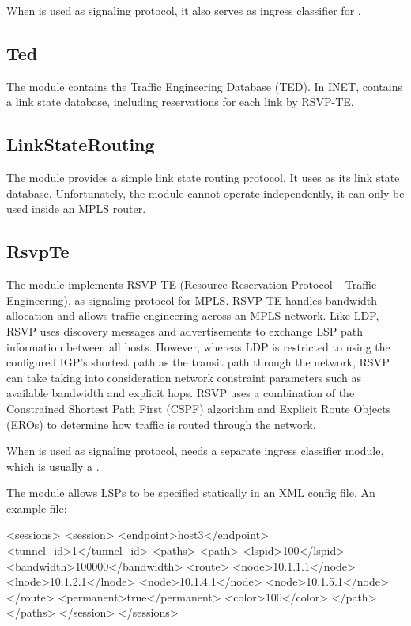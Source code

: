 When  is used as signaling protocol, it also serves as ingress
classifier for .

\subsection{Ted}
\label{sec:mpls:ted}

The  module contains the Traffic Engineering Database (TED).
In INET,  contains a link state database, including reservations
for each link by RSVP-TE.

\subsection{LinkStateRouting}
\label{sec:mpls:linkstaterouting}

The  module provides a simple link state routing
protocol. It uses  as its link state database. Unfortunately, the
 module cannot operate independently, it can only be
used inside an MPLS router.

 \subsection{RsvpTe}
\label{sec:mpls:rsvpte}

The  module implements RSVP-TE (Resource Reservation Protocol --
Traffic Engineering), as signaling protocol for MPLS. RSVP-TE handles bandwidth
allocation and allows traffic engineering across an MPLS network. Like LDP, RSVP
uses discovery messages and advertisements to exchange LSP path information
between all hosts. However, whereas LDP is restricted to using the configured
IGP's shortest path as the transit path through the network, RSVP can take
taking into consideration network constraint parameters such as available
bandwidth and explicit hops. RSVP uses a combination of the Constrained Shortest
Path First (CSPF) algorithm and Explicit Route Objects (EROs) to determine how
traffic is routed through the network.

When  is used as signaling protocol,  needs a
separate ingress classifier module, which is usually a .

The  module allows LSPs to be specified statically in an XML
config file. An example  file:

\begin{XML}
<sessions>
    <session>
        <endpoint>host3</endpoint>
        <tunnel_id>1</tunnel_id>
        <paths>
            <path>
                <lspid>100</lspid>
                <bandwidth>100000</bandwidth>
                <route>
                    <node>10.1.1.1</node>
                    <lnode>10.1.2.1</lnode>
                    <node>10.1.4.1</node>
                    <node>10.1.5.1</node>
                </route>
                <permanent>true</permanent>
                <color>100</color>
            </path>
        </paths>
    </session>
</sessions>
\end{XML}

